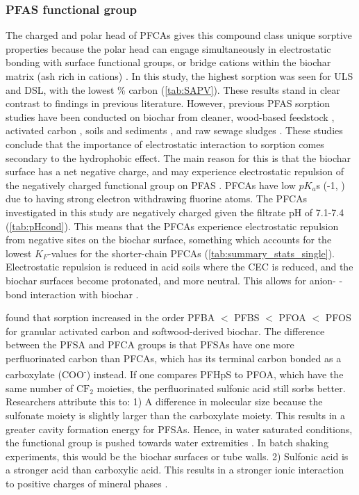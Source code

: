\subsubsection{PFAS functional group} 
The charged and polar head of PFCAs gives this compound class unique sorptive properties because the polar head can engage simultaneously in electrostatic bonding with surface functional groups, or bridge cations within the biochar matrix (ash rich in cations) \citep{zhang2013sorption,sigmund2022sorption}. In this study, the highest sorption was seen for ULS and DSL, with the lowest \% carbon (\cref{tab:SAPV}). These results stand in clear contrast to findings in previous literature. However, previous PFAS sorption studies have been conducted on biochar from cleaner, wood-based feedstock \citep{Sormo2021}, activated carbon \citep{zhang2021sorption,Kupryianchyk2016b}, soils and sediments \citep{higgins2006sorption}, and raw sewage sludges \citep{zhang2013sorption}. These studies conclude that the importance of electrostatic interaction to sorption comes secondary to the hydrophobic effect. The main reason for this is that the biochar surface has a net negative charge, and may experience electrostatic repulsion of the negatively charged functional group on PFAS \citep{Ahmad2014}. PFCAs have low $pK_a$s (-1, \citep{goss2008pKa}) due to having strong electron withdrawing fluorine atoms. The PFCAs investigated in this study are negatively charged given the filtrate pH of 7.1-7.4 (\cref{tab:pHcond}). This means that the PFCAs experience electrostatic repulsion from negative sites on the biochar surface, something which accounts for the lowest $K_F$-values for the shorter-chain PFCAs (\cref{tab:summary_stats_single}). Electrostatic repulsion is reduced in acid soils where the CEC is reduced, and the biochar surfaces become protonated, and more neutral. This allows for anion- \textpi-bond interaction with biochar \citep{sigmund2022sorption}. 

\cite{zhang2021sorption} found that sorption increased in the order PFBA $<$ PFBS $<$ PFOA $<$ PFOS for granular activated carbon and softwood-derived biochar. The difference between the PFSA and PFCA groups is that PFSAs have one more perfluorinated carbon than PFCAs, which has its terminal carbon bonded as a carboxylate (COO\textsuperscript{-}) instead. If one compares PFHpS to PFOA, which have the same number of $\mathrm{CF_2}$ moieties, the perfluorinated sulfonic acid still sorbs better. Researchers attribute this to: 1) A difference in molecular size because the sulfonate moiety is slightly larger than the carboxylate moiety. This results in a greater cavity formation energy for PFSAs. Hence, in water saturated conditions, the functional group is pushed towards water extremities \citep{yin2022insights,sigmund2022sorption}. In batch shaking experiments, this would be the biochar surfaces or tube walls. 2) Sulfonic acid is a stronger acid than carboxylic acid. This results in a stronger ionic interaction to positive charges of mineral phases \citep{arvaniti2015review}. 

